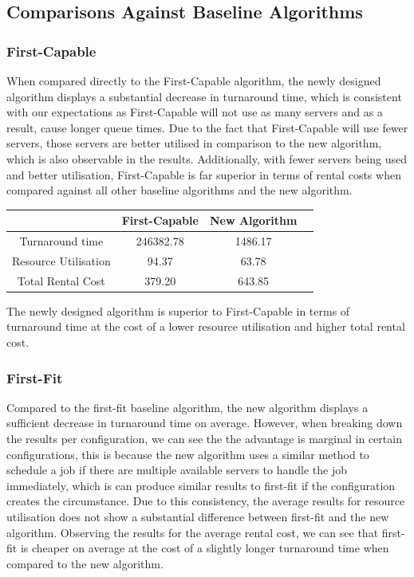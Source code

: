 \documentclass[a4paper]{article}
\begin{document}
\subsection*{Comparisons Against Baseline Algorithms}
\subsubsection*{First-Capable}
When compared directly to the First-Capable algorithm, the newly designed algorithm displays a substantial decrease in turnaround time, which is consistent with our expectations as First-Capable will not use as many servers and as a result, cause longer queue times. Due to the fact that First-Capable will use fewer servers, those servers are better utilised in comparison to the new algorithm, which is also observable in the results. Additionally, with fewer servers being used and better utilisation, First-Capable is far superior in terms of rental costs when compared against all other baseline algorithms and the new algorithm.

\begin{center}
\begin{tabular}{|c|c|c|c|} 
 \hline
   & First-Capable & New Algorithm \\ [0.5ex] 
 \hline
 Turnaround time & 246382.78 & 1486.17 \\ 
 \hline
 Resource Utilisation & 94.37 & 63.78 \\
 \hline
 Total Rental Cost & 379.20 & 643.85 \\
 \hline
\end{tabular}
\end{center}

The newly designed algorithm is superior to First-Capable in terms of turnaround time at the cost of a lower resource utilisation and higher total rental cost.

\subsubsection*{First-Fit}
Compared to the first-fit baseline algorithm, the new algorithm displays a sufficient decrease in turnaround time on average. However, when breaking down the results per configuration, we can see the the advantage is marginal in certain configurations, this is because the new algorithm uses a similar method to schedule a job if there are multiple available servers to handle the job immediately, which is can produce similar results to first-fit if the configuration creates the circumstance. Due to this consistency, the average results for resource utilisation does not show a substantial difference between first-fit and the new algorithm. Observing the results for the average rental cost, we can see that first-fit is cheaper on average at the cost of a slightly longer turnaround time when compared to the new algorithm.
\end{document}
